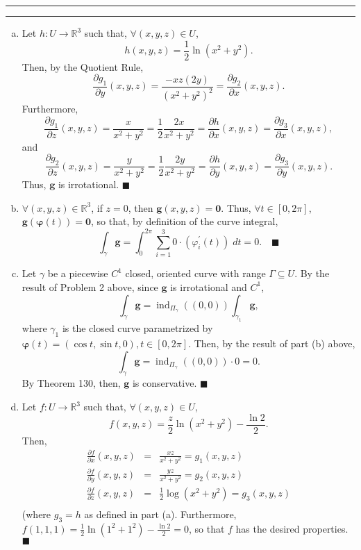 \documentclass[11pt]{article}
\newcounter{questionCounter}
\newcounter{partCounter}[questionCounter]
\newenvironment{question}[2][\arabic{questionCounter}]{%
    \setcounter{partCounter}{0}%
    \vspace{.25in} \hrule \vspace{0.5em}%
        \noindent{\bf #2}%
    \vspace{0.8em} \hrule \vspace{.10in}%
    \addtocounter{questionCounter}{1}%
}{}
\begin{document}
\begin{question}{Problem 3}
\begin{enumerate}[(a)]
\item Let $h:U \rightarrow \mathbb{R}^3$ such that, $\forall (x,y,z) \in U$,
\[h(x,y,z) = \frac12\ln(x^2 + y^2).\]
Then, by the Quotient Rule,
\[\frac{\partial g_1}{\partial y}(x,y,z)
 = \frac{-xz(2y)}{(x^2 + y^2)^2}
 = \frac{\partial g_2}{\partial x}(x,y,z).\]
Furthermore,
\[\frac{\partial g_1}{\partial z}(x,y,z)
 = \frac{x}{x^2 + y^2}
 = \frac12\frac{2x}{x^2 + y^2}
 = \frac{\partial h}{\partial x}(x,y,z)
 = \frac{\partial g_3}{\partial x}(x,y,z),\]
and
\[\frac{\partial g_2}{\partial z}(x,y,z)
 = \frac{y}{x^2 + y^2}
 = \frac12\frac{2y}{x^2 + y^2}
 = \frac{\partial h}{\partial y}(x,y,z)
 = \frac{\partial g_3}{\partial y}(x,y,z).\]
Thus, $\mathbf{g}$ is irrotational. \quad $\blacksquare$

\item $\forall (x,y,z) \in \mathbb{R}^3$, if $z = 0$, then
$\mathbf{g}(x,y,z) = \mathbf{0}$. Thus, $\forall t \in [0,2\pi]$,
$\mathbf{g}(\boldsymbol{\varphi}(t)) = \mathbf{0}$, so that, by definition of the
curve integral,
\[\int_{\gamma} \mathbf{g}
 = \int_0^{2\pi} \sum_{i = 1}^3 0\cdot(\varphi_i^{\prime}(t)) \; dt
 = 0. \quad \blacksquare\]

\item Let $\gamma$ be a piecewise $C^1$ closed, oriented curve with range
$\Gamma \subseteq U$. By the result of Problem 2 above, since $\mathbf{g}$ is
irrotational and $C^1$,
\[\int_{\gamma} \mathbf{g}
 = \operatorname{ind}_{\Pi_{\gamma}}((0,0)) \int_{\gamma_1} \mathbf{g},\]
where $\gamma_1$ is the closed curve parametrized by
$\boldsymbol{\varphi}(t) = (\cos t, \sin t, 0), t \in [0,2 \pi]$.
Then, by the result of part (b) above,
\[\int_{\gamma} \mathbf{g}
 = \operatorname{ind}_{\Pi_{\gamma}}((0,0))\cdot 0 = 0.\]
By Theorem 130, then, $\mathbf{g}$ is conservative. \quad $\blacksquare$

\item Let $f: U \rightarrow \mathbb{R}^3$ such that, $\forall (x,y,z) \in U$,
\[f(x,y,z) = \frac{z}{2}\ln(x^2 + y^2) - \frac{\ln 2}{2}.\]
Then,
\begin{eqnarray*}
\frac{\partial f}{\partial x}(x,y,z) & = & \frac{xz}{x^2 + y^2} = g_1(x,y,z) \\
\frac{\partial f}{\partial y}(x,y,z) & = & \frac{yz}{x^2 + y^2} = g_2(x,y,z) \\
\frac{\partial f}{\partial z}(x,y,z) & = & \frac12 \log(x^2 + y^2) = g_3(x,y,z) \\
\end{eqnarray*}
(where $g_3 = h$ as defined in part (a). Furthermore,
$f(1,1,1) = \frac{1}{2} \ln(1^2 + 1^2) - \frac{\ln 2}{2} = 0$,
so that $f$ has the desired properties. \quad $\blacksquare$

\end{enumerate}
\end{question}
\end{document}

